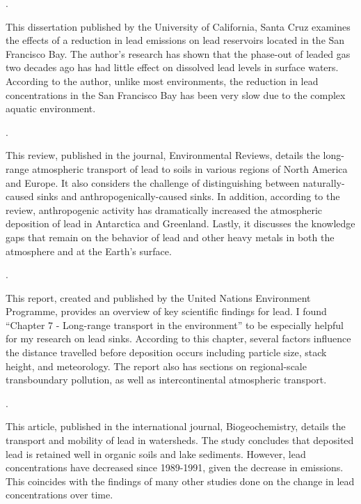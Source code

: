 \documentclass{article}\usepackage[]{graphicx}\usepackage[]{color}
\begin{document}
\medskip

\noindent {}.

\medskip

This dissertation published by the University of California, Santa Cruz examines the effects of a reduction in lead emissions on lead reservoirs located in the San Francisco Bay. The author’s research has shown that the phase-out of leaded gas two decades ago has had little effect on dissolved lead levels in surface waters. According to the author, unlike most environments, the reduction in lead concentrations in the San Francisco Bay has been very slow due to the complex aquatic environment.

\medskip

\noindent {}.

\medskip

This review, published in the journal, Environmental Reviews, details the long-range atmospheric transport of lead to soils in various regions of North America and Europe. It also considers the challenge of distinguishing between naturally-caused sinks and anthropogenically-caused sinks. In addition, according to the review, anthropogenic activity has dramatically increased the atmospheric deposition of lead in Antarctica and Greenland. Lastly, it discusses the knowledge gaps that remain on the behavior of lead and other heavy metals in both the atmosphere and at the Earth’s surface.

\medskip

\noindent {}.

\medskip

This report, created and published by the United Nations Environment Programme, provides an overview of key scientific findings for lead. I found “Chapter 7 - Long-range transport in the environment” to be especially helpful for my research on lead sinks. According to this chapter, several factors influence the distance travelled before deposition occurs including particle size, stack height, and meteorology. The report also has sections on regional-scale transboundary pollution, as well as intercontinental atmospheric transport.

\medskip

\noindent {}.

\medskip

This article, published in the international journal, Biogeochemistry, details the transport and mobility of lead in watersheds. The study concludes that deposited lead is retained well in organic soils and lake sediments. However, lead concentrations have decreased since 1989-1991, given the decrease in emissions. This coincides with the findings of many other studies done on the change in lead concentrations over time. 
\end{document}

